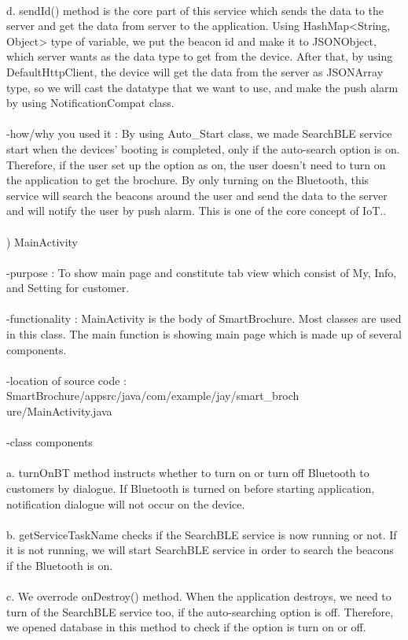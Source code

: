 \documentclass[conference]{IEEEtran}
\begin{document}
\\ d. sendId() method is the core part of this service which sends the data to the server and get the data from server to the application. Using HashMap<String, Object> type of variable, we put the beacon id and make it to JSONObject, which server wants as the data type to get from the device. After that, by using DefaultHttpClient, the device will get the data from the server as JSONArray type, so we will cast the datatype that we want to use, and make the push alarm by using NotificationCompat class.\\
\\ -how/why you used it : By using  Auto\_Start class, we made SearchBLE service start when the devices’ booting is completed, only if the auto-search option is on. Therefore, if the user set up the option as on, the user doesn’t need to turn on the application to get the brochure. By only turning on the Bluetooth, this service will search the beacons around the user and send the data to the server and will notify the user by push alarm. This is one of the core concept of IoT..\\\\
) MainActivity\\\\
-purpose : To show main page and constitute tab view which consist of My, Info, and Setting for customer.\\
\\ -functionality : MainActivity is the body of SmartBrochure. Most classes are used in this class. The main function is showing main page which is made up of several components.\\
\\ -location of source code : SmartBrochure/appsrc/java/com/example/jay/smart\_broch
ure/MainActivity.java\\
\\ -class components\\
\\ a. turnOnBT method instructs whether to turn on or turn off Bluetooth to customers by dialogue. If Bluetooth is turned on before starting application, notification dialogue will not occur on the device.\\
\\ b. getServiceTaskName checks if the SearchBLE service is now running or not. If it is not running, we will start SearchBLE service in order to search the beacons if the Bluetooth is on.\\
\\ c. We overrode onDestroy() method.  When the application destroys, we need to turn of the SearchBLE service too, if the auto-searching option is off. Therefore, we opened database in this method to check if the option is turn on or off.\\
\end{document}
